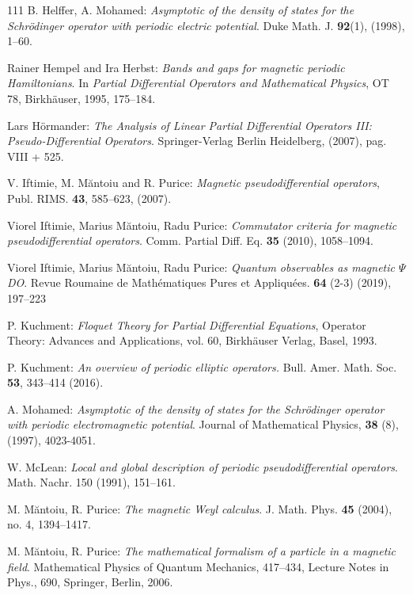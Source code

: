 \documentclass[12pt]{article}
\theoremstyle{definition}
\numberwithin{equation}{section}
\begin{document}
\begin{thebibliography}{111}
 B. Helffer, A. Mohamed: \textit{Asymptotic of the density of states for the Schr\"odinger operator with periodic electric potential}. Duke Math. J. \textbf{92}(1), (1998), 1--60.

 Rainer Hempel and Ira Herbst: \textit{Bands and gaps for magnetic periodic Hamiltonians}. In \textit{Partial Differential Operators and Mathematical Physics}, OT 78, Birkh\"{a}user, 1995,  175--184.

 Lars H\"{o}rmander:
\textit{The Analysis of Linear Partial Differential Operators III: Pseudo-Differential Operators}. Springer-Verlag Berlin Heidelberg, (2007), pag. VIII + 525.

 V. Iftimie, M. M\u antoiu and R. Purice: {\it Magnetic
pseudodifferential operators}, Publ. RIMS. {\bf 43}, 585--623, (2007).

 Viorel Iftimie, Marius M\u{a}ntoiu, Radu Purice: \textit{Commutator criteria for magnetic pseudodifferential operators}. Comm. Partial Diff. Eq. \textbf{35} (2010), 1058--1094.

 Viorel Iftimie, Marius M\u{a}ntoiu, Radu Purice: \textit{Quantum observables as magnetic $\Psi$DO}.  Revue Roumaine de Math\'ematiques Pures et Appliqu\'ees. \textbf{64} (2-3)
(2019),  197--223

 P. Kuchment: \textit{Floquet Theory for Partial Differential Equations}, Operator Theory: Advances
and Applications, vol. 60, Birkh\"{a}user Verlag, Basel, 1993.

 P. Kuchment: {\it An overview of periodic elliptic operators.} Bull. Amer. Math. Soc. {\bf 53}, 343--414 (2016).

 A. Mohamed: \textit{Asymptotic of the density of states for the Schr\"odinger operator with periodic electromagnetic potential}. Journal of Mathematical Physics, \textbf{38} (8), (1997), 4023-4051.

 W. McLean: \textit{Local and global description of periodic pseudodifferential operators}. Math. Nachr. 150 (1991), 151--161.

M. M\u{a}ntoiu, R. Purice: \textit{The magnetic Weyl calculus}. J. Math. Phys. \textbf{45} (2004), no. 4, 1394--1417.

M. M\u{a}ntoiu, R. Purice: \textit{The mathematical formalism of a particle in a magnetic field}. Mathematical Physics of Quantum Mechanics, 417--434, Lecture Notes in Phys., 690, Springer, Berlin, 2006.


\end{thebibliography}
\end{document}
